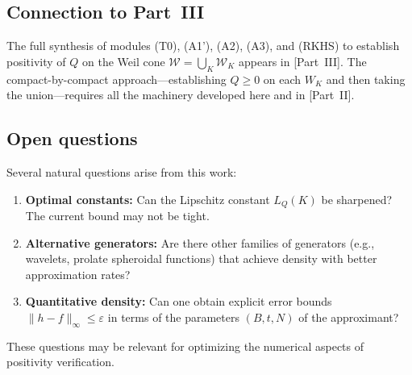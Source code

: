 \documentclass[11pt,a4paper]{article}
\theoremstyle{definition}
\theoremstyle{remark}
\begin{document}
\subsection{Connection to Part~III}

The full synthesis of modules (T0), (A1'), (A2), (A3), and (RKHS) to establish positivity of $Q$ on the Weil cone $\mathcal{W} = \bigcup_K \mathcal{W}_K$ appears in [Part~III]. The compact-by-compact approach---establishing $Q \geq 0$ on each $W_K$ and then taking the union---requires all the machinery developed here and in [Part~II].

\subsection{Open questions}

Several natural questions arise from this work:

\begin{enumerate}
\item \textbf{Optimal constants:} Can the Lipschitz constant $L_Q(K)$ be sharpened? The current bound may not be tight.

\item \textbf{Alternative generators:} Are there other families of generators (e.g., wavelets, prolate spheroidal functions) that achieve density with better approximation rates?

\item \textbf{Quantitative density:} Can one obtain explicit error bounds $\|h - f\|_\infty \leq \varepsilon$ in terms of the parameters $(B, t, N)$ of the approximant?
\end{enumerate}

These questions may be relevant for optimizing the numerical aspects of positivity verification.

\end{document}
